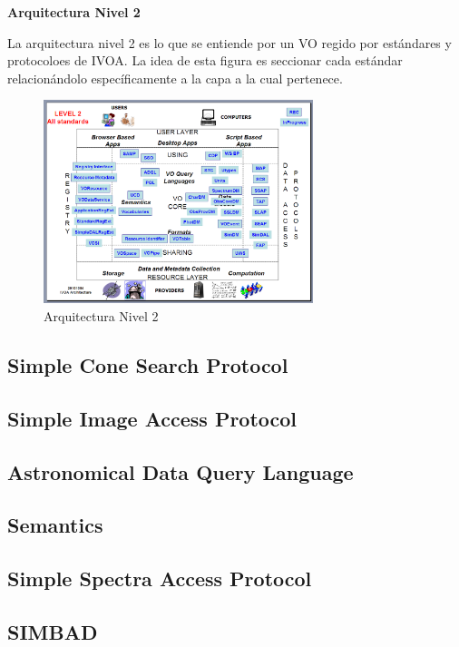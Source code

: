 \textbf{Arquitectura Nivel 2}%


La arquitectura nivel 2 es lo que se entiende por un VO regido por estándares
y protocoloes de IVOA.
La idea de esta figura es seccionar cada estándar relacionándolo específicamente
a la capa a la cual pertenece.

\begin{figure}
    \centering
    \includegraphics[width=0.7\textwidth]{img/arquitectura_2.png}
    \caption{Arquitectura Nivel 2}
    \label{fig:nivel2}
\end{figure}


\subsection{Simple Cone Search Protocol}
\subsection{Simple Image Access Protocol}
\subsection{Astronomical Data Query Language}
\subsection{Semantics}
\subsection{Simple Spectra Access Protocol}
\subsection{SIMBAD}
